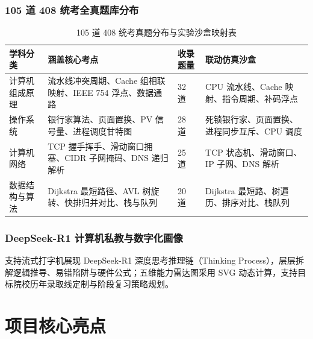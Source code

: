\documentclass[UTF8,a4paper,11pt]{ctexart}
\begin{document}
\subsubsection{105 道 408 统考全真题库分布}

\begin{table}[htbp]
\centering
\small
\caption{105 道 408 统考真题分布与实验沙盒映射表}
\begin{tabularx}{\textwidth}{p{3.2cm}Xp{2.2cm}p{4cm}}
\toprule
\textbf{学科分类} & \textbf{涵盖核心考点} & \textbf{收录题量} & \textbf{联动仿真沙盒} \\
\midrule
计算机组成原理 & 流水线冲突周期、Cache 组相联映射、IEEE 754 浮点、数据通路 & 32 道 & CPU 流水线、Cache 映射、指令周期、补码浮点 \\
操作系统 & 银行家算法、页面置换、PV 信号量、进程调度甘特图 & 28 道 & 死锁银行家、页面置换、进程同步互斥、CPU 调度 \\
计算机网络 & TCP 握手挥手、滑动窗口拥塞、CIDR 子网掩码、DNS 递归解析 & 25 道 & TCP 状态机、滑动窗口、IP 子网、DNS 解析 \\
数据结构与算法 & Dijkstra 最短路径、AVL 树旋转、快排归并对比、栈与队列 & 20 道 & Dijkstra 最短路、树遍历、排序对比、栈队列 \\
\bottomrule
\end{tabularx}
\end{table}

\subsubsection{DeepSeek-R1 计算机私教与数字化画像}
支持流式打字机展现 DeepSeek-R1 深度思考推理链（Thinking Process），层层拆解逻辑推导、易错陷阱与硬件公式；五维能力雷达图采用 SVG 动态计算，支持目标院校历年录取线定制与阶段复习策略规划。

\section{项目核心亮点}
\end{document}
